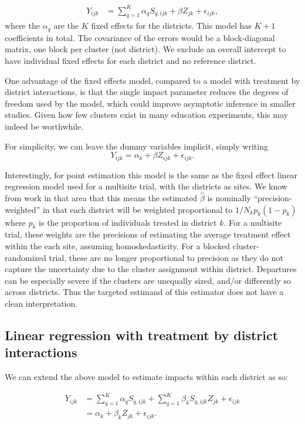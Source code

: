\documentclass[12pt]{article}
\begin{document}
\begin{align*}
Y_{ijk} &=  \sum_{q=1}^K \alpha_{q} S_{q,ijk} + \beta Z_{jk} + \epsilon_{ijk} ,
\end{align*}
where the $\alpha_q$ are the $K$ fixed effects for the districts.
This model has $K+1$ coefficients in total. The covariance of the
errors would be a block-diagonal matrix, one block per cluster (not
district). We exclude an overall intercept to have individual fixed
effects for each district and no reference district.

One advantage of the fixed effects model, compared to a model with treatment by district interactions, is that the single impact parameter reduces the degrees of freedom used by the
model, which could improve asymptotic inference in smaller studies.
Given how few clusters exist in many education experiments, this may
indeed be worthwhile.

For simplicity, we can leave the dummy variables implicit,
simply writing \[
 Y_{ijk} =  \alpha_k + \beta Z_{ijk} + \epsilon_{ijk}.
\]

Interestingly, for point estimation this model is the same as the fixed effect linear regression model used for a multisite trial, with the districts as sites.
We know from work in that area that this means the estimated $\hat{\beta}$ is nominally ``precision-weighted'' in that each district will be weighted proportional to $1 / N_{k} p_k (1-p_k)$ where $p_k$ is the proportion of individuals treated in district $k$.
For a multisite trial, these weights are the precisions of estimating the average treatment effect within the each site, assuming homoskedasticity.
For a blocked cluster-randomized trial, these are no longer proportional to precision as they do not capture the uncertainty due to the cluster assignment within district.
Departures can be especially severe if the clusters are unequally sized, and/or differently so across districts.
Thus the targeted estimand of this estimator does not have a clean interpretation.



\subsection{Linear regression with treatment by district interactions}
\label{sec:ols-interacted-by-district}

We can extend the above model to estimate impacts within each district as so:

\[
\begin{aligned}
Y_{ijk} &= \sum_{q=1}^K \alpha_{q} S_{q,ijk} + \sum_{q=1}^K \beta_k  S_{q,ijk} Z_{jk} + \epsilon_{ijk} \\
 &= \alpha_k + \beta_k Z_{jk} + \epsilon_{ijk} .
\end{aligned}
\]
\end{document}

